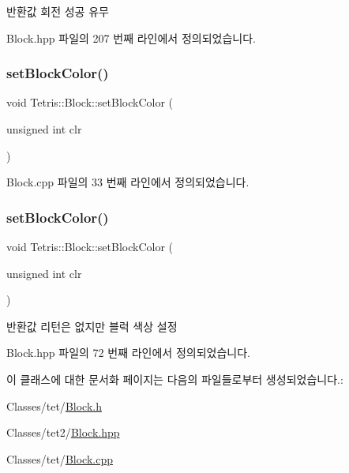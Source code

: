 \begin{DoxyReturn}{반환값}
회전 성공 유무 
\end{DoxyReturn}


Block.\+hpp 파일의 207 번째 라인에서 정의되었습니다.

\mbox{\label{class_tetris_1_1_block_a1a3fab9e7eabe64a4ba588ed5091d3a9}} 
\subsubsection{\texorpdfstring{set\+Block\+Color()}{setBlockColor()}\hspace{0.1cm}{\footnotesize\ttfamily [1/2]}}
{\footnotesize\ttfamily void Tetris\+::\+Block\+::set\+Block\+Color (\begin{DoxyParamCaption}\item[{unsigned int}]{clr }\end{DoxyParamCaption})}



Block.\+cpp 파일의 33 번째 라인에서 정의되었습니다.

\mbox{\label{class_tetris_1_1_block_a1a3fab9e7eabe64a4ba588ed5091d3a9}} 
\subsubsection{\texorpdfstring{set\+Block\+Color()}{setBlockColor()}\hspace{0.1cm}{\footnotesize\ttfamily [2/2]}}
{\footnotesize\ttfamily void Tetris\+::\+Block\+::set\+Block\+Color (\begin{DoxyParamCaption}\item[{unsigned int}]{clr }\end{DoxyParamCaption})\hspace{0.3cm}{\ttfamily [inline]}}

\begin{DoxyReturn}{반환값}
리턴은 없지만 블럭 색상 설정 
\end{DoxyReturn}


Block.\+hpp 파일의 72 번째 라인에서 정의되었습니다.



이 클래스에 대한 문서화 페이지는 다음의 파일들로부터 생성되었습니다.\+:\begin{DoxyCompactItemize}
\item 
Classes/tet/\hyperlink{_block_8h}{Block.\+h}\item 
Classes/tet2/\hyperlink{_block_8hpp}{Block.\+hpp}\item 
Classes/tet/\hyperlink{_block_8cpp}{Block.\+cpp}\end{DoxyCompactItemize}
